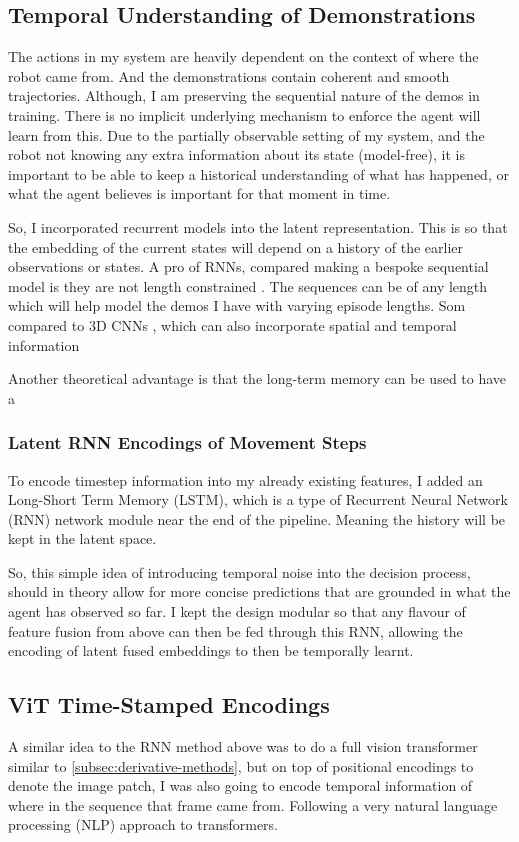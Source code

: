 \subsection{Temporal Understanding of Demonstrations}
The actions in my system are heavily dependent on the context of where the robot came from. And the demonstrations contain coherent and smooth trajectories. Although, I am preserving the sequential nature of the demos in training. There is no implicit underlying mechanism to enforce the agent will learn from this. Due to the partially observable setting of my system, and the robot not knowing any extra information about its state (model-free), it is important to be able to keep a historical understanding of what has happened, or what the agent believes is important for that moment in time.

So, I incorporated recurrent models into the latent representation. This is so that the embedding of the current states will depend on a history of the earlier observations or states.
A pro of RNNs, compared making a bespoke sequential model is they are not length constrained . The sequences can be of any length which will help model the demos I have with varying episode lengths. Som compared to 3D CNNs , which can also incorporate spatial and temporal information 


Another theoretical advantage is that the long-term memory can be used to have a 

\subsubsection{Latent RNN Encodings of Movement Steps}
To encode timestep information into my already existing features, I added an Long-Short Term Memory (LSTM), which is a type of Recurrent Neural Network (RNN)  network module near the end of the pipeline. Meaning the history will be kept in the latent space.

So, this simple idea of introducing temporal noise into the decision process, should in theory allow for more concise predictions that are grounded in what the agent has observed so far. I kept the design modular so that any flavour of feature fusion from above can then be fed through this RNN, allowing the encoding of latent fused embeddings to then be temporally learnt.

\subsection{ViT Time-Stamped Encodings}
A similar idea to the RNN method above was to do a full vision transformer similar to \ref{subsec:derivative-methods}, but on top of positional encodings to denote the image patch, I was also going to encode temporal information of where in the sequence that frame came from. Following a very natural language processing (NLP) approach to transformers.

